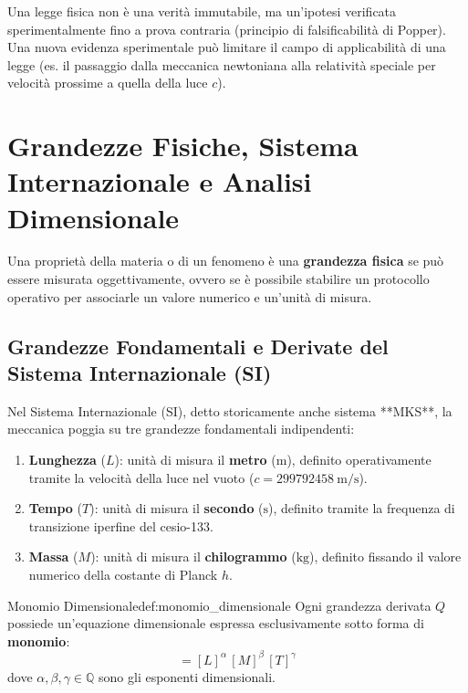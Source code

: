 \begin{osservazione}
Una legge fisica non è una verità immutabile, ma un'ipotesi verificata sperimentalmente fino a prova contraria (principio di falsificabilità di Popper). Una nuova evidenza sperimentale può limitare il campo di applicabilità di una legge (es. il passaggio dalla meccanica newtoniana alla relatività speciale per velocità prossime a quella della luce $c$).
\end{osservazione}

\section{Grandezze Fisiche, Sistema Internazionale e Analisi Dimensionale}
\label{sec:grandezze_si}

Una proprietà della materia o di un fenomeno è una \textbf{grandezza fisica} se può essere misurata oggettivamente, ovvero se è possibile stabilire un protocollo operativo per associarle un valore numerico e un'unità di misura.

\subsection{Grandezze Fondamentali e Derivate del Sistema Internazionale (SI)}

Nel Sistema Internazionale (SI), detto storicamente anche sistema **MKS**, la meccanica poggia su tre grandezze fondamentali indipendenti:
\begin{enumerate}
    \item \textbf{Lunghezza} ($L$): unità di misura il \textbf{metro} ($\si{\metre}$), definito operativamente tramite la velocità della luce nel vuoto ($c = \SI{299792458}{\metre\per\second}$).
    \item \textbf{Tempo} ($T$): unità di misura il \textbf{secondo} ($\si{\second}$), definito tramite la frequenza di transizione iperfine del cesio-133.
    \item \textbf{Massa} ($M$): unità di misura il \textbf{chilogrammo} ($\si{\kilogram}$), definito fissando il valore numerico della costante di Planck $h$.
\end{enumerate}

\begin{definizione}{Monomio Dimensionale}{def:monomio_dimensionale}
Ogni grandezza derivata $Q$ possiede un'equazione dimensionale espressa esclusivamente sotto forma di \textbf{monomio}:
\begin{equation}
    [Q] = [L]^\alpha \, [M]^\beta \, [T]^\gamma
    \label{eq:monomio_dimensionale}
\end{equation}
dove $\alpha, \beta, \gamma \in \mathbb{Q}$ sono gli esponenti dimensionali.
\end{definizione}

